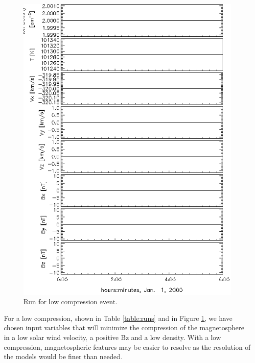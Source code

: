 \begin{figure}
	\centering
	\includegraphics[scale=0.5]{images/Run4.png}
	\caption{Run for low compression event.}
    \label{fig:lowcompression}
	\figSpace
\end{figure}

For a low compression, shown in Table \ref{table:runs} and in Figure
\ref{fig:lowcompression}, we have chosen input variables that will minimize the
compression of the magnetosphere in a low solar wind velocity, a positive Bz and
a low density. With a low compression, magnetospheric features may be easier to
resolve as the resolution of the models would be finer than needed.

